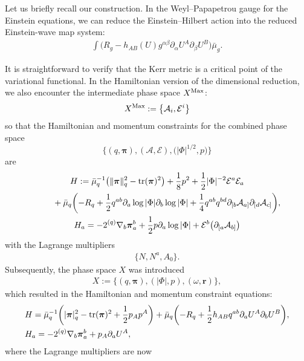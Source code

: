 \documentclass[pdftex]{sigma}
\def\ptl{\partial}%
\def\mbo#1{\boldsymbol{#1}}%
\def\grad{{\nabla}}%
\newcommand{\leftexp}[2]{{\vphantom{#2}}^{#1}{#2}}
\def\halb{\frac{1}{2}}%
\def \a{\alpha}
\def \b {\beta}
\renewcommand{\a}{\alpha}
\renewcommand{\b}{\beta}
\numberwithin{equation}{section}
\begin{document}
Let us briefly recall our construction. In the Weyl--Papapetrou gauge for the Einstein equations, we can reduce the Einstein--Hilbert action
into the reduced Einstein-wave map system:
\begin{align*}
\int \bigl(R_g - h_{AB}(U) g^{\a \b} \ptl_\a U^A \ptl_\b U^B\bigr) \bar{\mu}_g.
\end{align*}

It is straightforward to verify that the Kerr metric is a critical point of the variational functional. In the Hamiltonian version of the dimensional reduction, we also encounter the intermediate phase space $X^{{\rm Max}}$:
\begin{align*}
	X^{{\rm Max}} := \bigl\{\mathcal{A}_i, \mathcal{E}^i \bigr\}
	\end{align*}
	so that the Hamiltonian and momentum constraints for the combined phase space
 \[
 \bigl\{ (q, \mbo{\pi}), (\mathcal{A}, \mathcal{E}), \bigl(\vert \Phi \vert^{1/2}, p\bigr) \bigr\}
 \]
are 	
	\begin{gather*}
	H := \bar{\mu}^{-1}_q \bigl(\Vert \mbo{\pi} \Vert^2_q - {\rm tr}(\mbo{\pi})^2\bigr) + \frac{1}{8} p^2 + \frac{1}{2} \vert \Phi \vert^{-2} \mathcal{E}^a \mathcal{E}_a \\
\hphantom{H :=}{}
	 + \bar{\mu}_q \biggl(-R_q + \halb q^{ab} \ptl_a \log \vert \Phi \vert \ptl_b \log \vert \Phi \vert
	 + \frac{1}{4} q^{ab} q^{bd} \ptl_{[b} \mathcal{A}_{a]} \ptl_{[d} \mathcal{A}_{c]} \biggr), \\
	H_a = -2 \leftexp{(q)}{\grad}_b \mbo{\pi}^b_a + \halb p \ptl_a \log \vert \Phi \vert + \mathcal{E}^b \bigl(\ptl_{[a} \mathcal{A}_{b]}\bigr)
	\end{gather*}
	with the Lagrange multipliers
	\begin{align*}
	\{ N, N^a, A_0\}.
	\end{align*}
	Subsequently, the phase space $X$ was introduced
	\begin{align*}
	X := \{ (q, \mbo{\pi}), (\vert \Phi \vert, p), (\omega, \mbo{r}) \},
	\end{align*}
	which resulted in the Hamiltonian and momentum constraint equations:
	\begin{align*}
	&H= \bar{\mu}^{-1}_q \biggl(\vert \mbo{\pi} \vert^2_q - {\rm tr} (\mbo{\pi})^2 + \halb p_A p^A\biggr) + \bar{\mu}_q \biggl(- R_q + \halb h_{AB} q^{ab} \ptl_a U^A \ptl_b U^B\biggr) ,\\
	&H_a= -2 \leftexp{(q)}{\grad}_b \mbo{\pi}^b_a + p_A \ptl_a U^A,
	\end{align*}
	where the Lagrange multipliers are now	
\end{document}
